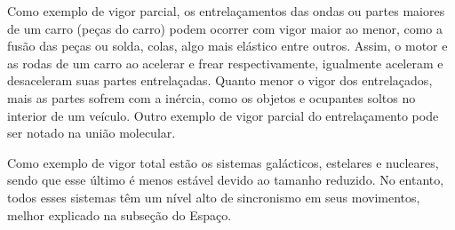 Como exemplo de vigor parcial, os entrelaçamentos das ondas ou partes maiores de um carro (peças do carro) podem ocorrer com vigor maior ao menor, como a fusão das peças ou solda, colas, algo mais elástico entre outros. Assim, o motor e as rodas de um carro ao acelerar e frear respectivamente, igualmente aceleram e desaceleram suas partes entrelaçadas. Quanto menor o vigor dos entrelaçados, mais as partes sofrem com a inércia, como os objetos e ocupantes soltos no interior de um veículo. Outro exemplo de vigor parcial do entrelaçamento pode ser notado na união molecular.

Como exemplo de vigor total estão os sistemas galácticos, estelares e nucleares, sendo que esse último é menos estável devido ao tamanho reduzido. No entanto, todos esses sistemas têm um nível alto de sincronismo em seus movimentos, melhor explicado na subseção do Espaço.

